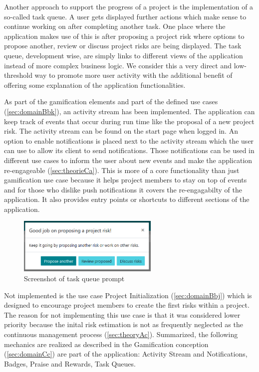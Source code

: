Another approach to support the progress of a project is the implementation of a so-called task queue. A user gets displayed further actions which make sense to continue working on after completing another task. One place where the application makes use of this is after proposing a project risk where options to propose another, review or discuss project risks are being displayed. The task queue, development wise, are simply links to different views of the application instead of more complex business logic. We consider this a very direct and low-threshold way to promote more user activity with the additional benefit of offering some explanation of the application functionalities.

As part of the gamification elements and part of the defined use cases (\ref{sec:domainBbk}), an activity stream has been implemented. The application can keep track of events that occur during run time like the proposal of a new project risk. The activity stream can be found on the start page when logged in. An option to enable notifications is placed next to the activity stream which the user can use to allow its client to send notifications. Those notifications can be used in different use cases to inform the user about new events and make the application re-engageable (\ref{sec:theorieCa}). This is more of a core functionality than just gamification use case because it helps project members to stay on top of events and for those who dislike push notifications it covers the re-engagabilty of the application. It also provides entry points or shortcuts to different sections of the application.

\begin{figure}[H]
	\centering
	\includegraphics[width=0.6\textwidth]{Assets/implementation_shots/task_queue.png}
	\caption{Screenshot of task queue prompt}
	\label{fig:taskqueue}
\end{figure}

Not implemented is the use case Project Initialization (\ref{sec:domainBbj}) which is designed to encourage project members to create the first risks within a project. The reason for not implementing this use case is that it was considered lower priority because the inital risk estimation is not as frequently neglected as the continuous management process (\ref{sec:theoryAc}).
Summarized, the following mechanics are realized as described in the Gamification conception (\ref{sec:domainCc}) are part of the application: Activity Stream and Notifications, Badges, Praise and Rewards, Task Queues.


